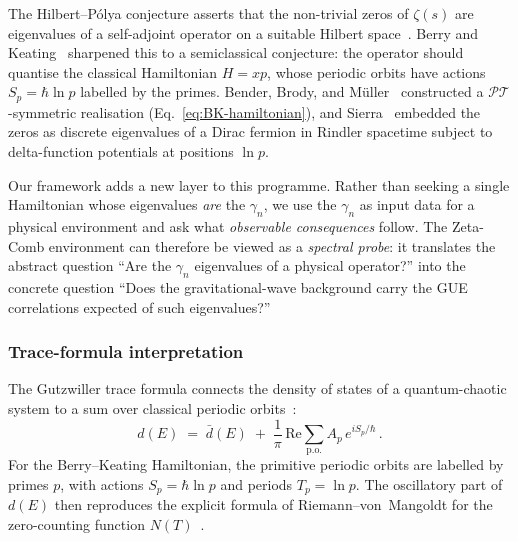 \documentclass[12pt,a4paper]{article}
\begin{document}
The Hilbert--P\'olya conjecture asserts that the non-trivial
zeros of $\zeta(s)$ are eigenvalues of a self-adjoint operator
on a suitable Hilbert space~\cite{HilbertPolya}.
Berry and Keating~\cite{BerryKeating1999} sharpened this to
a semiclassical conjecture: the operator should quantise the
classical Hamiltonian $H = xp$, whose periodic orbits have
actions $S_{p} = \hbar\ln p$ labelled by the primes.
Bender, Brody, and M\"uller~\cite{Bender2017BKHamiltonian}
constructed a $\mathcal{PT}$-symmetric realisation
(Eq.~\eqref{eq:BK-hamiltonian}), and
Sierra~\cite{Sierra2014Rindler} embedded the zeros as discrete
eigenvalues of a Dirac fermion in Rindler spacetime subject to
delta-function potentials at positions $\ln p$.

Our framework adds a new layer to this programme.
Rather than seeking a single Hamiltonian whose eigenvalues
\emph{are} the $\gamma_{n}$, we use the $\gamma_{n}$ as
input data for a physical environment and ask what
\emph{observable consequences} follow.
The Zeta-Comb environment can therefore be viewed as a
\emph{spectral probe}: it translates the abstract question
``Are the $\gamma_{n}$ eigenvalues of a physical operator?''
into the concrete question ``Does the gravitational-wave
background carry the GUE correlations expected of such
eigenvalues?''

\subsubsection{Trace-formula interpretation}

The Gutzwiller trace formula connects the density of states
of a quantum-chaotic system to a sum over classical periodic
orbits~\cite{Gutzwiller1971}:
%
\begin{equation}
  d(E)
  \;=\;
  \bar{d}(E)
  \;+\;
  \frac{1}{\pi}\,\mathrm{Re}
  \sum_{\mathrm{p.o.}}
  A_{p}\,e^{iS_{p}/\hbar}\,.
  \label{eq:gutzwiller}
\end{equation}
%
For the Berry--Keating Hamiltonian, the primitive periodic
orbits are labelled by primes $p$, with actions
$S_{p} = \hbar\ln p$ and periods $T_{p} = \ln p$.
The oscillatory part of $d(E)$ then reproduces the explicit
formula of Riemann--von~Mangoldt for the zero-counting
function $N(T)$~\cite{Edwards1974}.
\end{document}
